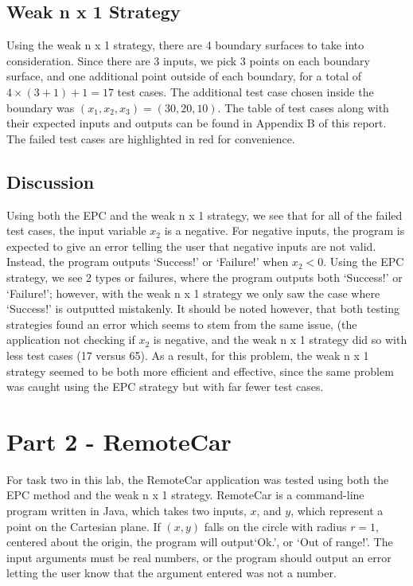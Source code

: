 \documentclass[letterpaper]{article}
\begin{document}
\subsection{Weak n x 1 Strategy}
Using the weak n x 1 strategy, there are 4 boundary surfaces to take into
consideration. Since there are 3 inputs, we pick 3 points on each boundary
surface, and one additional point outside of each boundary, for a total of
$4\times (3 + 1) + 1 = 17$ test cases. The additional test case chosen inside
the boundary was $(x_1, x_2, x_3) = (30, 20, 10)$. The table of test cases
along with their expected inputs and outputs can be found in Appendix B of this
report. The failed test cases are highlighted in red for convenience.

\subsection{Discussion}
Using both the EPC and the weak n x 1 strategy, we see that for all of the
failed test cases, the input variable $x_2$ is a negative. For negative
inputs, the program is expected to give an error telling the user that 
negative inputs are not valid. Instead, the program outputs `Success!'
or `Failure!' when $x_2 < 0$. Using the EPC strategy, we see
2 types or failures, where the program outputs both `Success!'                       
or `Failure!'; however, with the weak n x 1 strategy we only saw the case where
`Success!' is outputted mistakenly. It should be noted however, that both
testing strategies found an error which seems to stem from the same issue,
(the application not checking if $x_2$ is negative, and the weak n x 1 strategy
did so with less test cases (17 versus 65). As a result, for this problem,
the weak n x 1 strategy seemed to be both more efficient and effective,
since the same problem was caught using the EPC strategy but with far fewer
test cases.


\section{Part 2 - RemoteCar}
For task two in this lab, the RemoteCar application was tested using both the
EPC method and the weak n x 1 strategy. RemoteCar is a command-line program
written in Java, which takes two inputs, $x$, and $y$, which represent a
point on the Cartesian plane.
If $(x,y)$ falls on the circle with radius $r=1$, centered about the origin,
the program will output`Ok.', or `Out of range!'. The input arguments must
be real numbers, or the program should output an error letting the user know
that the argument entered was not a number.
\end{document}
